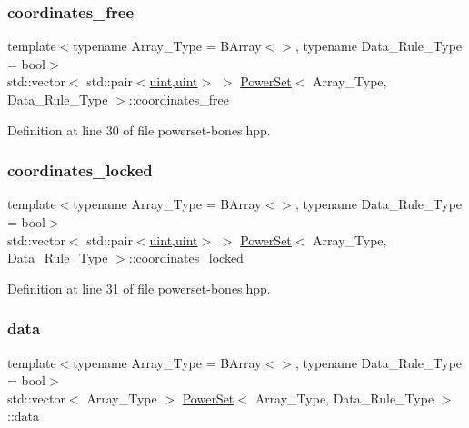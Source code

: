 \subsubsection{\texorpdfstring{coordinates\+\_\+free}{coordinates\_free}}
{\footnotesize\ttfamily template$<$typename Array\+\_\+\+Type  = B\+Array$<$$>$, typename Data\+\_\+\+Rule\+\_\+\+Type  = bool$>$ \\
std\+::vector$<$ std\+::pair$<$\hyperlink{typedefs_8hpp_a91ad9478d81a7aaf2593e8d9c3d06a14}{uint},\hyperlink{typedefs_8hpp_a91ad9478d81a7aaf2593e8d9c3d06a14}{uint}$>$ $>$ \hyperlink{class_power_set}{Power\+Set}$<$ Array\+\_\+\+Type, Data\+\_\+\+Rule\+\_\+\+Type $>$\+::coordinates\+\_\+free}



Definition at line 30 of file powerset-\/bones.\+hpp.

\mbox{\label{class_power_set_ac5cdec06502e8bd20e36fca3abbb9a3e}} 
\subsubsection{\texorpdfstring{coordinates\+\_\+locked}{coordinates\_locked}}
{\footnotesize\ttfamily template$<$typename Array\+\_\+\+Type  = B\+Array$<$$>$, typename Data\+\_\+\+Rule\+\_\+\+Type  = bool$>$ \\
std\+::vector$<$ std\+::pair$<$\hyperlink{typedefs_8hpp_a91ad9478d81a7aaf2593e8d9c3d06a14}{uint},\hyperlink{typedefs_8hpp_a91ad9478d81a7aaf2593e8d9c3d06a14}{uint}$>$ $>$ \hyperlink{class_power_set}{Power\+Set}$<$ Array\+\_\+\+Type, Data\+\_\+\+Rule\+\_\+\+Type $>$\+::coordinates\+\_\+locked}



Definition at line 31 of file powerset-\/bones.\+hpp.

\mbox{\label{class_power_set_af456c157d157692ba5890c549c51af75}} 
\subsubsection{\texorpdfstring{data}{data}}
{\footnotesize\ttfamily template$<$typename Array\+\_\+\+Type  = B\+Array$<$$>$, typename Data\+\_\+\+Rule\+\_\+\+Type  = bool$>$ \\
std\+::vector$<$ Array\+\_\+\+Type $>$ \hyperlink{class_power_set}{Power\+Set}$<$ Array\+\_\+\+Type, Data\+\_\+\+Rule\+\_\+\+Type $>$\+::data}



